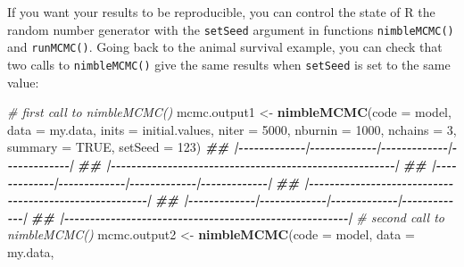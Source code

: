 \documentclass[
  12pt,
]{krantz}
\newenvironment{Shaded}{\begin{snugshade}}{\end{snugshade}}
\newcommand{\AttributeTok}[1]{\textcolor[rgb]{0.13,0.29,0.53}{#1}}
\newcommand{\CommentTok}[1]{\textcolor[rgb]{0.56,0.35,0.01}{\textit{#1}}}
\newcommand{\ConstantTok}[1]{\textcolor[rgb]{0.56,0.35,0.01}{#1}}
\newcommand{\DecValTok}[1]{\textcolor[rgb]{0.00,0.00,0.81}{#1}}
\newcommand{\DocumentationTok}[1]{\textcolor[rgb]{0.56,0.35,0.01}{\textbf{\textit{#1}}}}
\newcommand{\FunctionTok}[1]{\textcolor[rgb]{0.13,0.29,0.53}{\textbf{#1}}}
\newcommand{\NormalTok}[1]{#1}
\newcommand{\OtherTok}[1]{\textcolor[rgb]{0.56,0.35,0.01}{#1}}
\begin{document}
If you want your results to be reproducible, you can control the state of R the random number generator with the \texttt{setSeed} argument in functions \texttt{nimbleMCMC()} and \texttt{runMCMC()}. Going back to the animal survival example, you can check that two calls to \texttt{nimbleMCMC()} give the same results when \texttt{setSeed} is set to the same value:

\begin{Shaded}
\begin{Highlighting}[]
\CommentTok{\# first call to nimbleMCMC()}
\NormalTok{mcmc.output1 }\OtherTok{\textless{}{-}} \FunctionTok{nimbleMCMC}\NormalTok{(}\AttributeTok{code =}\NormalTok{ model,}
                           \AttributeTok{data =}\NormalTok{ my.data,}
                           \AttributeTok{inits =}\NormalTok{ initial.values,}
                           \AttributeTok{niter =} \DecValTok{5000}\NormalTok{,}
                           \AttributeTok{nburnin =} \DecValTok{1000}\NormalTok{,}
                           \AttributeTok{nchains =} \DecValTok{3}\NormalTok{,}
                           \AttributeTok{summary =} \ConstantTok{TRUE}\NormalTok{,}
                           \AttributeTok{setSeed =} \DecValTok{123}\NormalTok{)}
\DocumentationTok{\#\# |{-}{-}{-}{-}{-}{-}{-}{-}{-}{-}{-}{-}{-}|{-}{-}{-}{-}{-}{-}{-}{-}{-}{-}{-}{-}{-}|{-}{-}{-}{-}{-}{-}{-}{-}{-}{-}{-}{-}{-}|{-}{-}{-}{-}{-}{-}{-}{-}{-}{-}{-}{-}{-}|}
\DocumentationTok{\#\# |{-}{-}{-}{-}{-}{-}{-}{-}{-}{-}{-}{-}{-}{-}{-}{-}{-}{-}{-}{-}{-}{-}{-}{-}{-}{-}{-}{-}{-}{-}{-}{-}{-}{-}{-}{-}{-}{-}{-}{-}{-}{-}{-}{-}{-}{-}{-}{-}{-}{-}{-}{-}{-}{-}{-}|}
\DocumentationTok{\#\# |{-}{-}{-}{-}{-}{-}{-}{-}{-}{-}{-}{-}{-}|{-}{-}{-}{-}{-}{-}{-}{-}{-}{-}{-}{-}{-}|{-}{-}{-}{-}{-}{-}{-}{-}{-}{-}{-}{-}{-}|{-}{-}{-}{-}{-}{-}{-}{-}{-}{-}{-}{-}{-}|}
\DocumentationTok{\#\# |{-}{-}{-}{-}{-}{-}{-}{-}{-}{-}{-}{-}{-}{-}{-}{-}{-}{-}{-}{-}{-}{-}{-}{-}{-}{-}{-}{-}{-}{-}{-}{-}{-}{-}{-}{-}{-}{-}{-}{-}{-}{-}{-}{-}{-}{-}{-}{-}{-}{-}{-}{-}{-}{-}{-}|}
\DocumentationTok{\#\# |{-}{-}{-}{-}{-}{-}{-}{-}{-}{-}{-}{-}{-}|{-}{-}{-}{-}{-}{-}{-}{-}{-}{-}{-}{-}{-}|{-}{-}{-}{-}{-}{-}{-}{-}{-}{-}{-}{-}{-}|{-}{-}{-}{-}{-}{-}{-}{-}{-}{-}{-}{-}{-}|}
\DocumentationTok{\#\# |{-}{-}{-}{-}{-}{-}{-}{-}{-}{-}{-}{-}{-}{-}{-}{-}{-}{-}{-}{-}{-}{-}{-}{-}{-}{-}{-}{-}{-}{-}{-}{-}{-}{-}{-}{-}{-}{-}{-}{-}{-}{-}{-}{-}{-}{-}{-}{-}{-}{-}{-}{-}{-}{-}{-}|}
\CommentTok{\# second call to nimbleMCMC()}
\NormalTok{mcmc.output2 }\OtherTok{\textless{}{-}} \FunctionTok{nimbleMCMC}\NormalTok{(}\AttributeTok{code =}\NormalTok{ model,}
                           \AttributeTok{data =}\NormalTok{ my.data,}

\end{Highlighting}
\end{Shaded}
\end{document}

